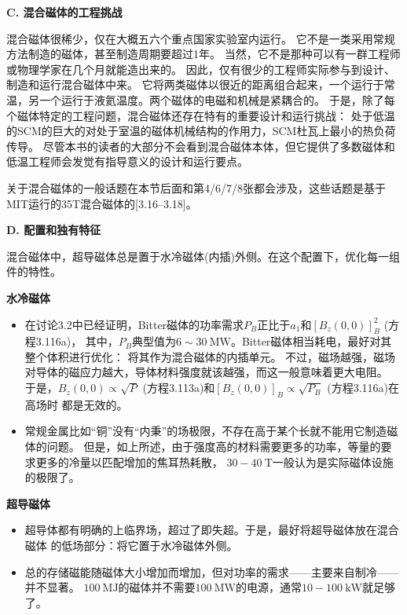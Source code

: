 \textbf{C. 混合磁体的工程挑战}

混合磁体很稀少，仅在大概五六个重点国家实验室内运行。
它不是一类采用常规方法制造的磁体，甚至制造周期要超过1年。
当然，它不是那种可以有一群工程师或物理学家在几个月就能造出来的。
因此，仅有很少的工程师实际参与到设计、制造和运行混合磁体中来。
它将两类磁体以很近的距离组合起来，一个运行于常温，另一个运行于液氦温度。两个磁体的电磁和机械是紧耦合的。
于是，除了每个磁体特定的工程问题，混合磁体还存在特有的重要设计和运行挑战：
处于低温的SCM的巨大的对处于室温的磁体机械结构的作用力，SCM杜瓦上最小的热负荷传导。
尽管本书的读者的大部分不会看到混合磁体本体，但它提供了多数磁体和低温工程师会发觉有指导意义的设计和运行要点。

关于混合磁体的一般话题在本节后面和第4/6/7/8张都会涉及，这些话题是基于MIT运行的35T混合磁体的[3.16–3.18]。

\textbf{D. 配置和独有特征}

混合磁体中，超导磁体总是置于水冷磁体(内插)外侧。在这个配置下，优化每一组件的特性。

\textbf{\kaishu 水冷磁体}
\begin{itemize}
	\item 在讨论3.2中已经证明，Bitter磁体的功率需求$P_B$正比于$a_1$和$[B_z(0, 0)]^2_B$ (方程3.116a)，
	其中，$P_B$典型值为$6\sim 30\ \mathrm{MW}$。Bitter磁体相当耗电，最好对其整个体积进行优化：
	将其作为混合磁体的内插单元。
	不过，磁场越强，磁场对导体的磁应力越大，导体材料强度就该越强，而这一般意味着更大电阻。
	于是，$B_z(0, 0)\propto\sqrt{P}$ (方程3.113a)和$[B_z(0, 0)]_B\propto\sqrt{P_B}$ (方程3.116a)在高场时
	都是无效的。
	
	\item 常规金属比如“铜”没有“内秉”的场极限，不存在高于某个长就不能用它制造磁体的问题。
	但是，如上所述，由于强度高的材料需要更多的功率，等量的要求更多的冷量以匹配增加的焦耳热耗散，
	$30-40\ \mathrm{T}$一般认为是实际磁体设施的极限了。
\end{itemize}

\textbf{\kaishu 超导磁体}
\begin{itemize}
	\item 超导体都有明确的上临界场，超过了即失超。于是，最好将超导磁体放在混合磁体
	的低场部分：将它置于水冷磁体外侧。
	
	\item 总的存储磁能随磁体大小增加而增加，但对功率的需求——主要来自制冷——并不显著。
	$100\ \mathrm{MJ}$的磁体并不需要$100\ \mathrm{MW}$的电源，通常$10-100\ \mathrm{kW}$就足够了。
\end{itemize}

